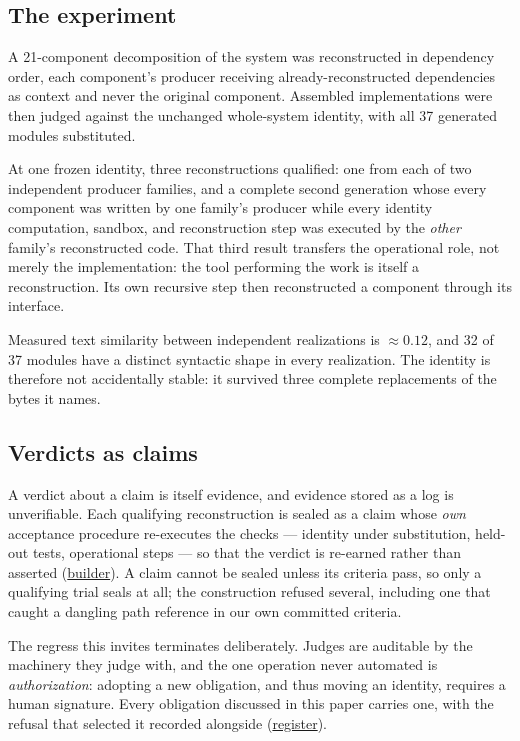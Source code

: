 \documentclass[10pt,twocolumn,letterpaper]{article}
\newcommand{\art}[2]{\href{https://github.com/rz4/reticuli/blob/5318acaac34ef99eeba9ff064a995a6313cc70ec/#1}{#2}}
\begin{document}
\subsection{The experiment}
A 21-component decomposition of the system was reconstructed in dependency order, each component's producer receiving already-reconstructed dependencies as context and never the original component. Assembled implementations were then judged against the unchanged whole-system identity, with all 37 generated modules substituted.

At one frozen identity, three reconstructions qualified: one from each of two independent producer families, and a complete second generation whose every component was written by one family's producer while every identity computation, sandbox, and reconstruction step was executed by the \emph{other} family's reconstructed code. That third result transfers the operational role, not merely the implementation: the tool performing the work is itself a reconstruction. Its own recursive step then reconstructed a component through its interface.

Measured text similarity between independent realizations is $\approx\!0.12$, and 32 of 37 modules have a distinct syntactic shape in every realization. The identity is therefore not accidentally stable: it survived three complete replacements of the bytes it names.

\subsection{Verdicts as claims}
A verdict about a claim is itself evidence, and evidence stored as a log is unverifiable. Each qualifying reconstruction is sealed as a claim whose \emph{own} acceptance procedure re-executes the checks --- identity under substitution, held-out tests, operational steps --- so that the verdict is re-earned rather than asserted (\art{research/harness/closure/trial_claim.py}{builder}). A claim cannot be sealed unless its criteria pass, so only a qualifying trial seals at all; the construction refused several, including one that caught a dangling path reference in our own committed criteria.

The regress this invites terminates deliberately. Judges are auditable by the machinery they judge with, and the one operation never automated is \emph{authorization}: adopting a new obligation, and thus moving an identity, requires a human signature. Every obligation discussed in this paper carries one, with the refusal that selected it recorded alongside (\art{research/metrics/genome-map.md}{register}).
\end{document}
